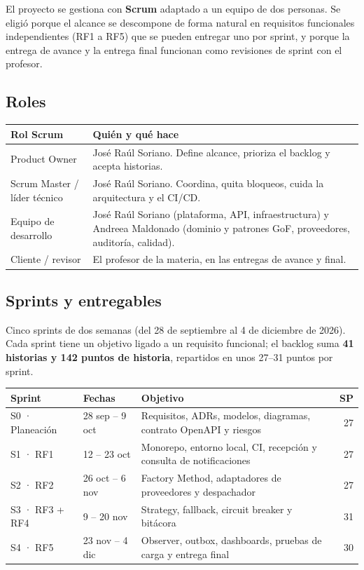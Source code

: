 \documentclass[11pt,a4paper]{article}
\begin{document}
El proyecto se gestiona con \textbf{Scrum} adaptado a un equipo de dos personas. Se eligió porque el alcance se
descompone de forma natural en requisitos funcionales independientes (RF1 a RF5) que se pueden entregar uno por
sprint, y porque la entrega de avance y la entrega final funcionan como revisiones de sprint con el profesor.

\subsection{Roles}
\begin{tabularx}{\textwidth}{@{}lX@{}}
\toprule
\textbf{Rol Scrum} & \textbf{Quién y qué hace} \\
\midrule
Product Owner & José Raúl Soriano. Define alcance, prioriza el backlog y acepta historias. \\
Scrum Master / líder técnico & José Raúl Soriano. Coordina, quita bloqueos, cuida la arquitectura y el CI/CD. \\
Equipo de desarrollo & José Raúl Soriano (plataforma, API, infraestructura) y Andreea Maldonado (dominio y patrones GoF, proveedores, auditoría, calidad). \\
Cliente / revisor & El profesor de la materia, en las entregas de avance y final. \\
\bottomrule
\end{tabularx}

\subsection{Sprints y entregables}
Cinco sprints de dos semanas (del 28 de septiembre al 4 de diciembre de 2026). Cada sprint tiene un objetivo ligado
a un requisito funcional; el backlog suma \textbf{41 historias y 142 puntos de historia}, repartidos en unos 27--31
puntos por sprint.

\begin{tabularx}{\textwidth}{@{}llXr@{}}
\toprule
\textbf{Sprint} & \textbf{Fechas} & \textbf{Objetivo} & \textbf{SP} \\
\midrule
S0 · Planeación & 28 sep -- 9 oct & Requisitos, ADRs, modelos, diagramas, contrato OpenAPI y riesgos & 27 \\
S1 · RF1 & 12 -- 23 oct & Monorepo, entorno local, CI, recepción y consulta de notificaciones & 27 \\
S2 · RF2 & 26 oct -- 6 nov & Factory Method, adaptadores de proveedores y despachador & 27 \\
S3 · RF3 + RF4 & 9 -- 20 nov & Strategy, fallback, circuit breaker y bitácora & 31 \\
S4 · RF5 & 23 nov -- 4 dic & Observer, outbox, dashboards, pruebas de carga y entrega final & 30 \\
\bottomrule
\end{tabularx}
\end{document}
